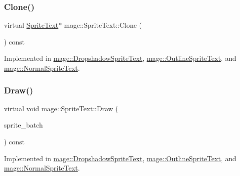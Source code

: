 \hypertarget{classmage_1_1_sprite_text_ac4edf927911a9fb8e5c3a674b217637a}{}\label{classmage_1_1_sprite_text_ac4edf927911a9fb8e5c3a674b217637a} 
\subsubsection{\texorpdfstring{Clone()}{Clone()}}
{\footnotesize\ttfamily virtual \hyperlink{classmage_1_1_sprite_text}{Sprite\+Text}$\ast$ mage\+::\+Sprite\+Text\+::\+Clone (\begin{DoxyParamCaption}{ }\end{DoxyParamCaption}) const\hspace{0.3cm}{\ttfamily [pure virtual]}}



Implemented in \hyperlink{classmage_1_1_dropshadow_sprite_text_a116c49fb9638414c67a09501c4031a01}{mage\+::\+Dropshadow\+Sprite\+Text}, \hyperlink{classmage_1_1_outline_sprite_text_a095a8ef1603b9045cecb6fd1263243be}{mage\+::\+Outline\+Sprite\+Text}, and \hyperlink{classmage_1_1_normal_sprite_text_aef48e90667849cd9ec01510baf1394cb}{mage\+::\+Normal\+Sprite\+Text}.

\hypertarget{classmage_1_1_sprite_text_a45d5ac8410d5a46b26e8491946a2ad9e}{}\label{classmage_1_1_sprite_text_a45d5ac8410d5a46b26e8491946a2ad9e} 
\subsubsection{\texorpdfstring{Draw()}{Draw()}}
{\footnotesize\ttfamily virtual void mage\+::\+Sprite\+Text\+::\+Draw (\begin{DoxyParamCaption}\item[{Sprite\+Batch \&}]{sprite\+\_\+batch }\end{DoxyParamCaption}) const\hspace{0.3cm}{\ttfamily [pure virtual]}}



Implemented in \hyperlink{classmage_1_1_dropshadow_sprite_text_af76422c9812d7dc38e9b98e587103c67}{mage\+::\+Dropshadow\+Sprite\+Text}, \hyperlink{classmage_1_1_outline_sprite_text_a524e9ad1caeeeaa32405e61d1a5e1032}{mage\+::\+Outline\+Sprite\+Text}, and \hyperlink{classmage_1_1_normal_sprite_text_ad2a1b02bea18afd6bf61b106a727a355}{mage\+::\+Normal\+Sprite\+Text}.

